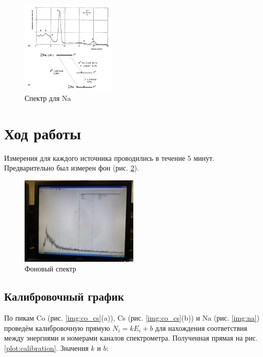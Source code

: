 \documentclass[a4paper, 12pt]{article}
\begin{document}
            \begin{figure}[ht!]
                \begin{center}
                    \includegraphics[width = 0.4\textwidth]{img/lab_na.png}
                    \caption{Спектр для Na}
                    \label{img:lab_na}
                \end{center}
            \end{figure}

    \section{Ход работы}

        Измерения для каждого источника проводились в течение 5 минут. Предварительно был измерен фон (рис. \ref{img:fon}).

        \begin{figure}[ht!]
            \begin{center}
                \includegraphics[width = 0.5\textwidth]{img/fon.jpg}
                \caption{Фоновый спектр}
                \label{img:fon}
            \end{center}
        \end{figure}

        \subsection{Калибровочный график}

            По пикам Co (рис. \ref{img:co_cs}(a)), Cs (рис. \ref{img:co_cs}(b)) и Na (рис. \ref{img:na}) проведём калибровочную прямую $N_i = kE_i + b$ для нахождения соответствия между энергиями и номерами каналов спектрометра. Полученная прямая на рис. \ref{plot:calibration}.
            Значения $k$ и $b$:
\end{document}
